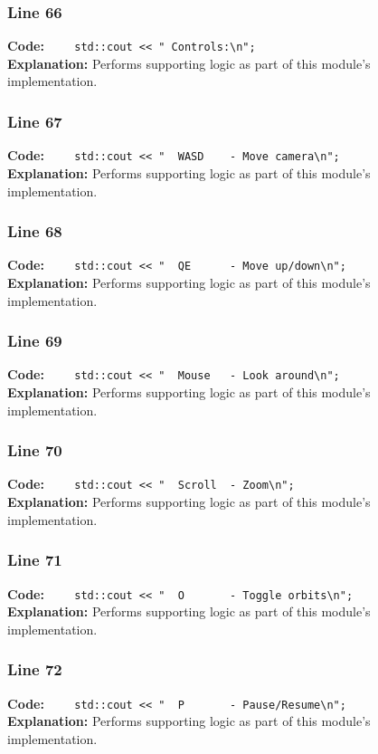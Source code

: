 \documentclass[11pt,a4paper]{article}
\begin{document}
\subsubsection*{Line 66}
\textbf{Code:} \verb|    std::cout << " Controls:\n";|\\
\textbf{Explanation:} Performs supporting logic as part of this module's implementation.

\subsubsection*{Line 67}
\textbf{Code:} \verb|    std::cout << "  WASD    - Move camera\n";|\\
\textbf{Explanation:} Performs supporting logic as part of this module's implementation.

\subsubsection*{Line 68}
\textbf{Code:} \verb|    std::cout << "  QE      - Move up/down\n";|\\
\textbf{Explanation:} Performs supporting logic as part of this module's implementation.

\subsubsection*{Line 69}
\textbf{Code:} \verb|    std::cout << "  Mouse   - Look around\n";|\\
\textbf{Explanation:} Performs supporting logic as part of this module's implementation.

\subsubsection*{Line 70}
\textbf{Code:} \verb|    std::cout << "  Scroll  - Zoom\n";|\\
\textbf{Explanation:} Performs supporting logic as part of this module's implementation.

\subsubsection*{Line 71}
\textbf{Code:} \verb|    std::cout << "  O       - Toggle orbits\n";|\\
\textbf{Explanation:} Performs supporting logic as part of this module's implementation.

\subsubsection*{Line 72}
\textbf{Code:} \verb|    std::cout << "  P       - Pause/Resume\n";|\\
\textbf{Explanation:} Performs supporting logic as part of this module's implementation.
\end{document}

